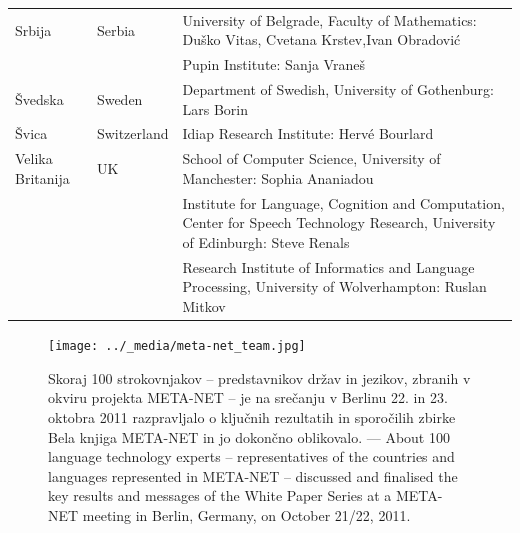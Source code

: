 \begin{longtable}{@{}llp{113mm}@{}}
  Srbija & \textcolor{grey1}{Serbia} & University of Belgrade, Faculty of Mathematics: Duško Vitas, Cvetana Krstev,\newline Ivan Obradović \\ \addlinespace
  & & Pupin Institute: Sanja Vraneš \\ \addlinespace  
  Švedska & \textcolor{grey1}{Sweden} & Department of Swedish, University of Gothenburg: Lars Borin \\ \addlinespace 
  Švica & \textcolor{grey1}{Switzerland} & Idiap Research Institute: Hervé Bourlard \\ \addlinespace 
  Velika Britanija & \textcolor{grey1}{UK} & School of Computer Science, University of Manchester: Sophia Ananiadou \\ \addlinespace
  & & Institute for Language, Cognition and Computation, Center for Speech Technology Research, University of Edinburgh: Steve Renals \\ \addlinespace 
  & & Research Institute of Informatics and Language Processing, University of Wolverhampton: Ruslan Mitkov%
\end{longtable}
\normalsize

\renewcommand*{\figureformat}{}
\renewcommand*{\captionformat}{}

\begin{figure}[htbp]
  \center
  \texttt{[image: ../\_media/meta-net\_team.jpg]}
  \caption{Skoraj 100 strokovnjakov -- predstavnikov držav in jezikov, zbranih v okviru projekta META-NET -- je na srečanju v Berlinu 22. in 23. oktobra 2011 razprav\-ljalo o ključnih rezultatih in sporočilih zbirke Bela knjiga META-NET in jo dokončno oblikovalo. --- \textcolor{grey1}{About 100 language technology experts -- representatives of the countries and languages represented in META-NET -- discussed and finalised the key results and messages of the White Paper Series at a META-NET meeting in Berlin, Germany, on October 21/22, 2011.}}\medskip
\end{figure}

\cleardoublepage

{}
\label{whitepaperseries}

